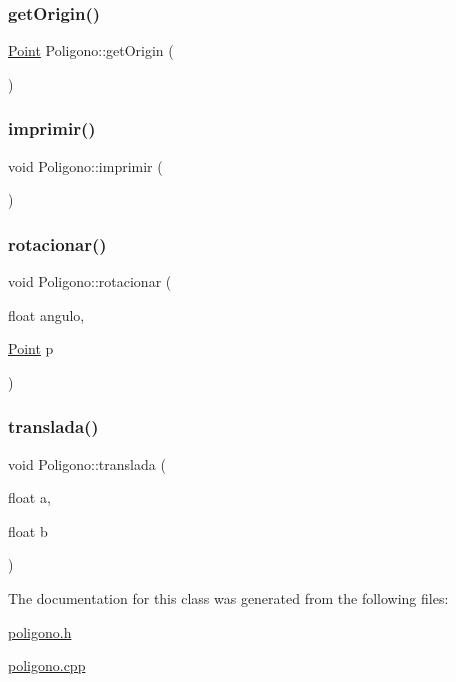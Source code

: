 \subsubsection{\texorpdfstring{get\+Origin()}{getOrigin()}}
{\footnotesize\ttfamily \hyperlink{class_point}{Point} Poligono\+::get\+Origin (\begin{DoxyParamCaption}{ }\end{DoxyParamCaption})}

\mbox{\label{class_poligono_a754dee9ed6a8fee4eb1a9d0aa0e1707a}} 
\subsubsection{\texorpdfstring{imprimir()}{imprimir()}}
{\footnotesize\ttfamily void Poligono\+::imprimir (\begin{DoxyParamCaption}{ }\end{DoxyParamCaption})}

\mbox{\label{class_poligono_a793b09b4f7cfd02930318521d008362d}} 
\subsubsection{\texorpdfstring{rotacionar()}{rotacionar()}}
{\footnotesize\ttfamily void Poligono\+::rotacionar (\begin{DoxyParamCaption}\item[{float}]{angulo,  }\item[{\hyperlink{class_point}{Point}}]{p }\end{DoxyParamCaption})}

\mbox{\label{class_poligono_adbf605dfd0419b7301c9be0ec1dbe41b}} 
\subsubsection{\texorpdfstring{translada()}{translada()}}
{\footnotesize\ttfamily void Poligono\+::translada (\begin{DoxyParamCaption}\item[{float}]{a,  }\item[{float}]{b }\end{DoxyParamCaption})}



The documentation for this class was generated from the following files\+:\begin{DoxyCompactItemize}
\item 
\hyperlink{poligono_8h}{poligono.\+h}\item 
\hyperlink{poligono_8cpp}{poligono.\+cpp}\end{DoxyCompactItemize}
